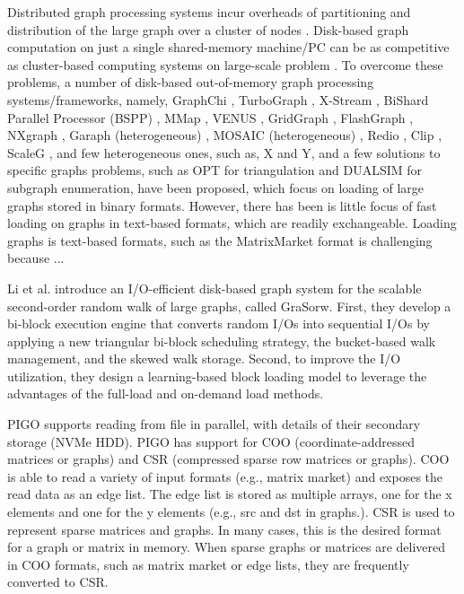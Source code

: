 Distributed graph processing systems incur overheads of partitioning and distribution of the large graph over a cluster of nodes \cite{najeebullah2014bishard, wang2021scaleg}. Disk-based graph computation on just a single shared-memory machine/PC can be as competitive as cluster-based computing systems on large-scale problem \cite{roy2013x, cheng2015venus}. To overcome these problems, a number of disk-based out-of-memory graph processing systems/frameworks, namely, GraphChi \cite{kyrola2012graphchi}, TurboGraph \cite{han2013turbograph}, X-Stream \cite{roy2013x}, BiShard Parallel Processor (BSPP) \cite{najeebullah2014bishard}, MMap \cite{lin2014mmap}, VENUS \cite{cheng2015venus}, GridGraph \cite{zhu2015gridgraph}, FlashGraph \cite{zheng2015flashgraph}, NXgraph \cite{chi2016nxgraph}, Garaph (heterogeneous) \cite{ma2017garaph}, MOSAIC (heterogeneous) \cite{maass2017mosaic}, Redio \cite{wu2018redio}, Clip \cite{ai2018clip}, ScaleG \cite{wang2021scaleg}, and few heterogeneous ones, such as, X and Y, and a few solutions to specific graphs problems, such as OPT \cite{kim2014opt} for triangulation and DUALSIM \cite{kim2016dualsim} for subgraph enumeration, have been proposed, which focus on loading of large graphs stored in binary formats. However, there has been is little focus of fast loading on graphs in text-based formats, which are readily exchangeable. Loading graphs is text-based formats, such as the MatrixMarket format is challenging because ...

Li et al. \cite{li2022efficient} introduce an I/O-efficient disk-based graph system for the scalable second-order random walk of large graphs, called GraSorw. First, they develop a bi-block execution engine that converts random I/Os into sequential I/Os by applying a new triangular bi-block scheduling strategy, the bucket-based walk management, and the skewed walk storage. Second, to improve the I/O utilization, they design a learning-based block loading model to leverage the advantages of the full-load and on-demand load methods.

PIGO supports reading from file in parallel, with details of their secondary storage (NVMe HDD). PIGO has support for COO (coordinate-addressed matrices or graphs) and CSR (compressed sparse row matrices or graphs). COO is able to read a variety of input formats (e.g., matrix market) and exposes the read data as an edge list. The edge list is stored as multiple arrays, one for the x elements and one for the y elements (e.g., src and dst in graphs.). CSR is used to represent sparse matrices and graphs. In many cases, this is the desired format for a graph or matrix in memory. When sparse graphs or matrices are delivered in COO formats, such as matrix market or edge lists, they are frequently converted to CSR.

